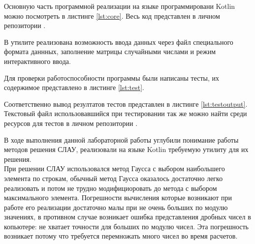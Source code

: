 Основную часть программной реализации на языке программировани Kotlin можно посмотреть в листинге \ref{lst:core}. Весь код представлен в личном репозитории \cite{itmocompmath}.


В утилите реализована возможность ввода данных через файл специального формата даннных, заполнение матрицы случайными числами и режим интерактивного ввода.

Для проверки работоспособности программы были написаны тесты, их содержимое представлено в листинге \ref{lst:test}. 


Соответственно вывод резултатов тестов представлен в листинге \ref{lst:testoutput}. Текстовый файл использовавшийся при тестировании так же можно найти среди ресурсов для тестов в личном репозитории \cite{itmocompmath}.


В ходе выполнения данной лабораторной работы углубили понимание работы методов решения СЛАУ, реализовали на языке Kotlin требуемую утилиту для их решения. \\
При решении СЛАУ использовался метод Гаусса с выбором наибольшего элемента по строкам, обычный метод Гаусса оказалось достаточно легко реализовать и потом не трудно модифициоровать до метода с выбором максимального элемента. Погрешности вычисления которые возникают при работе его реализации достаточно малы при не очень больших по модулю значениях, в противном случае возникает ошибка представления дробных чисел в копьютере: не хватает точности для больших по модулю чисел. Эта погрешность возникает потому что требуется перемножать много чисел во время расчетов.

\newpage



